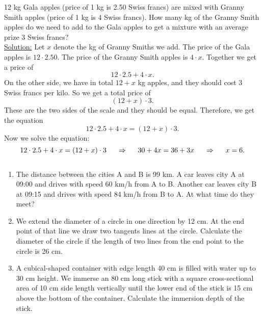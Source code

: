 \begin{example} $ $

12 kg Gala apples (price of 1 kg is 2.50 Swiss francs) are mixed with Granny Smith apples (price of 1 kg is 4 Swiss francs). How many kg of the Granny Smith apples do we need to add to the Gala apples to get a mixture with an average prize 3 Swiss francs?
\\

\underline{Solution:}
Let $x$ denote the kg of Granny Smiths we add. The price of the Gala apples is $12\cdot 2.50$. The price of the Granny Smith apples is $4\cdot x$. Together we get a price of 
\[
12\cdot 2.5 + 4\cdot x.
\]
On the other side, we have in total $12+x$ kg apples, and they should cost 3 Swiss francs per kilo. So we get a total price of 
\[
(12+x)\cdot 3.
\]
These are the two sides of the scale and they should be equal. Therefore, we get the equation
\[
12\cdot 2.5 + 4\cdot x = (12+x)\cdot 3.
\]
Now we solve the equation:
\[
12\cdot 2.5 + 4\cdot x = (12+x)\cdot 3 \hspace{5mm}\Rightarrow\hspace{5mm} 30+4x=36+3x \hspace{5mm}\Rightarrow\hspace{5mm} x=6. 
\]

\end{example}

\newpage
\begin{exer}
$ $

\begin{enumerate}[label=\emph{\alph*})]

\item The distance between the cities A and B is 99 km. A car leaves city A at 09:00 and drives with speed 60 km/h from A to B. Another car leaves city B at 09:15 and drives with speed 84 km/h from B to A. At what time do they meet?
\vfill

\item We extend the diameter of a circle in one direction by 12 cm. At the end point of that line we draw two tangents lines at the circle.
  Calculate the diameter of the circle if the length of two lines from the end point to the circle is 26 cm. 
\vfill

\item A cubical-shaped container with edge length 40 cm is filled with water up to 30 cm height. We immerse an 80  cm long stick with a square cross-sectional area of 10 cm side length vertically until the lower end of the stick is 15 cm above the bottom of the container. Calculate the immersion depth of the stick.
\vfill



\end{enumerate}
\end{exer}

